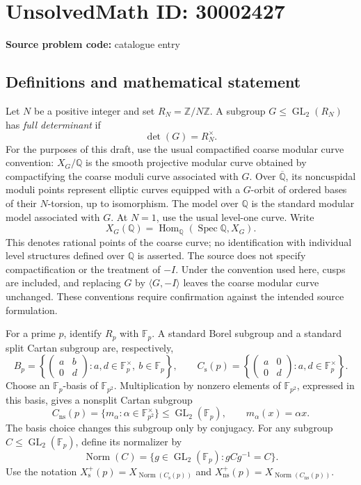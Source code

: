 \documentclass[11pt]{article}
\newcommand{\Z}{\mathbb{Z}}
\newcommand{\Q}{\mathbb{Q}}
\newcommand{\F}{\mathbb{F}}
\begin{document}
\section*{UnsolvedMath ID: 30002427}
\textbf{Source problem code:} catalogue entry
\subsection{Definitions and mathematical statement}
Let \(N\) be a positive integer and set \(R_N=\Z/N\Z\). A subgroup \(G\leq\operatorname{GL}_2(R_N)\) has \emph{full determinant} if
\[
\det(G)=R_N^{\times}.
\]
For the purposes of this draft, use the usual compactified coarse modular curve convention: \(X_G/\Q\) is the smooth projective modular curve obtained by compactifying the coarse moduli curve associated with \(G\). Over \(\overline{\Q}\), its noncuspidal moduli points represent elliptic curves equipped with a \(G\)-orbit of ordered bases of their \(N\)-torsion, up to isomorphism. The model over \(\Q\) is the standard modular model associated with \(G\). At \(N=1\), use the usual level-one curve. Write
\[
X_G(\Q)=\operatorname{Hom}_{\Q}(\operatorname{Spec}\Q,X_G).
\]
This denotes rational points of the coarse curve; no identification with individual level structures defined over \(\Q\) is asserted. The source does not specify compactification or the treatment of \(-I\). Under the convention used here, cusps are included, and replacing \(G\) by \(\langle G,-I\rangle\) leaves the coarse modular curve unchanged. These conventions require confirmation against the intended source formulation.

For a prime \(p\), identify \(R_p\) with \(\F_p\). A standard Borel subgroup and a standard split Cartan subgroup are, respectively,
\[
B_p=\left\{\begin{pmatrix}a&b\\0&d\end{pmatrix}:a,d\in\F_p^{\times},\ b\in\F_p\right\},
\qquad
C_{\mathrm{s}}(p)=\left\{\begin{pmatrix}a&0\\0&d\end{pmatrix}:a,d\in\F_p^{\times}\right\}.
\]
Choose an \(\F_p\)-basis of \(\F_{p^2}\). Multiplication by nonzero elements of \(\F_{p^2}\), expressed in this basis, gives a nonsplit Cartan subgroup
\[
C_{\mathrm{ns}}(p)=\{m_\alpha:\alpha\in\F_{p^2}^{\times}\}\leq\operatorname{GL}_2(\F_p),
\qquad m_\alpha(x)=\alpha x.
\]
The basis choice changes this subgroup only by conjugacy. For any subgroup \(C\leq\operatorname{GL}_2(\F_p)\), define its normalizer by
\[
\operatorname{Norm}(C)=\{g\in\operatorname{GL}_2(\F_p):gCg^{-1}=C\}.
\]
Use the notation \(X_{\mathrm{s}}^+(p)=X_{\operatorname{Norm}(C_{\mathrm{s}}(p))}\) and \(X_{\mathrm{ns}}^+(p)=X_{\operatorname{Norm}(C_{\mathrm{ns}}(p))}\).
\end{document}
